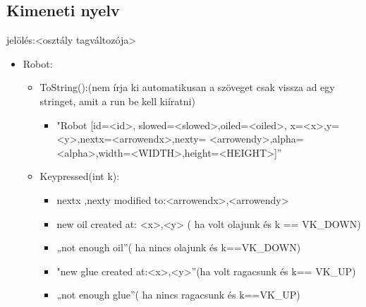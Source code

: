 \subsection{Kimeneti nyelv}
jelölés:<osztály tagváltozója>
\begin{itemize}
\item Robot: 
	\begin{itemize}
	\item ToString():(nem írja ki automatikusan a szöveget csak vissza ad egy stringet, amit a run be kell kiíratni)
	        \begin{itemize}
	\item "Robot [id=<id>,  slowed=<slowed>,oiled=<oiled>, x=<x>,y=<y>,nextx=<arrowendx>,nexty=
	        <arrowendy>,alpha=<alpha>,width=<WIDTH>,height=<HEIGHT>]” 
	        \end{itemize}
	\item Keypressed(int k):
	       \begin{itemize}
	        \item nextx ,nexty modified to:<arrowendx>,<arrowendy>
            \item new oil created at: <x>,<y> ( ha volt olajunk és k == VK\_DOWN)
            \item „not enough oil”( ha nincs olajunk és k==VK\_DOWN)
            \item "new glue created at:<x>,<y>”(ha volt ragacsunk és k== VK\_UP)
            \item „not enough glue”( ha nincs ragacsunk és k==VK\_UP)

	       \end{itemize}
	\end{itemize}
	

\end{itemize}
